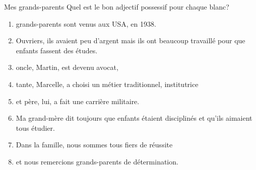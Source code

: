 \begin{frame}{Mes grands-parents}
  Quel est le bon adjectif possessif pour chaque blanc?
  \begin{enumerate}
    \item \underline{} grands-parents sont venus aux USA, en 1938.
    \item Ouvriers, ils avaient peu d'argent mais ils ont beaucoup travaillé pour que \underline{} enfants fassent des études.
    \item \underline{} oncle, Martin, est devenu avocat,
    \item \underline{} tante, Marcelle, a choisi un métier traditionnel, institutrice
    \item et \underline{} père, lui, a fait une carrière militaire.
    \item Ma grand-mère dit toujours que \underline{} enfants étaient disciplinés et qu'ils aimaient tous étudier.
    \item Dans la famille, nous sommes tous fiers de \underline{} réussite
    \item et nous remercions \underline{} grands-parents de \underline{} détermination.
  \end{enumerate}
\end{frame}